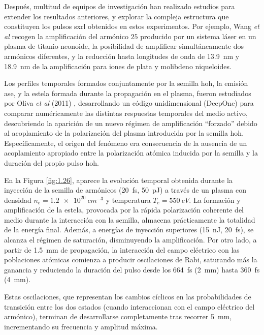 Después, multitud de equipos de investigación han realizado estudios para extender los resultados anteriores, y explorar la compleja estructura que constituyen los pulsos \acrshort{sxrl} obtenidos en estos experimentos. Por ejemplo, Wang \emph{et al} \autocite{Wang2006,Wang2008,Wang2014} recogen la amplificación del armónico $25$ producido por un sistema láser  en un plasma de titanio neonoide, la posibilidad de amplificar simultáneamente dos armónicos diferentes, y la reducción hasta longitudes de onda de \qty{13.9}{nm} y \qty{18.9}{nm} de la amplificación para iones de plata y molibdeno niqueloides.

Los perfiles temporales formados conjuntamente por la semilla \acrshort{hoh}, la emisión \acrshort{ase}, y la estela formada durante la propagación en el plasma\autocite{Wang2008}, fueron estudiados por Oliva \emph{et al} (2011) \autocite{Oliva2011}, desarrollando un código unidimensional (DeepOne) para comparar numéricamente las distintas respuestas temporales del medio activo, descubriendo la aparición de un nuevo régimen de amplificación \enquote{forzado} debido al acoplamiento de la polarización del plasma introducida por la semilla \acrshort{hoh}. Específicamente, el origen del fenómeno \autocite{Almiev2007} era consecuencia de la ausencia de un acoplamiento apropiado entre la polarización atómica inducida por la semilla y la duración del propio pulso \acrshort{hoh}.

En la Figura \ref{fig:1.26}, aparece la evolución temporal obtenida durante la inyección de la semilla de armónicos (\qty{20}{fs}, \qty{50}{pJ}) a través de un plasma con densidad $n_{e} = \qty{1.2e20}{cm^{-3}}$ y temperatura $T_{e} = \qty{550}{eV}$. La formación y amplificación de la estela, provocada por la rápida polarización coherente del medio durante la interacción con la semilla, almacena prácticamente la totalidad de la energía final. Además, a energías de inyección superiores (\qty{15}{nJ}, \qty{20}{fs}), se alcanza el régimen de saturación, disminuyendo la amplificación. Por otro lado, a partir de \qty{1.5}{mm} de propagación, la interacción del campo eléctrico con las poblaciones atómicas comienza a producir oscilaciones de Rabi, saturando más la ganancia y reduciendo la duración del pulso desde los \qty{664}{fs} (\qty{2}{mm}) hasta \qty{360}{fs} (\qty{4}{mm}).

Estas oscilaciones, que representan los cambios cíclicos en las probabilidades de transición entre los dos estados (cuando interaccionan con el campo eléctrico del armónico), terminan de desarrollarse completamente tras recorrer \qty{5}{mm}, incrementando su frecuencia y amplitud máxima.

